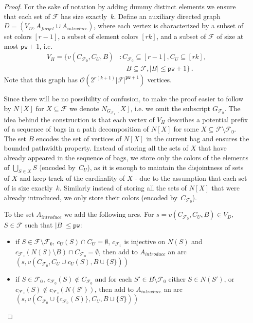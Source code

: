\documentclass[11pt]{article}
\theoremstyle{definition}
\newcommand{\cF}{{\mathcal{F}}}
\newcommand{\cg}{G_{\cF_0}}
\newcommand{\pw}{\ensuremath{\mathtt{pw}}\xspace}
\newcommand{\Oh}{\ensuremath{\mathcal{O}}}
\begin{document}
\begin{proof}
For the sake of notation by adding dummy distinct elements we ensure 
that each set of $\cF$ has size exactly~$k$.
Define an auxiliary directed graph $D=(V_D,A_{forget} \cup A_{introduce})$,
where each vertex is characterized by a subset of set colors $[r-1]$,
a subset of element colors $[rk]$, and a subset of $\cF$ of size at most $\pw+1$,
i.e.  
\begin{align*}
V_H = \{v(C_{\cF_0}, C_{U}, B) & : C_{\cF_0} \subseteq [r-1], C_U \subseteq [rk],\\
     & \quad B \subseteq \cF, |B| \le \pw+1\}\,.
\end{align*}
Note that this graph has $\Oh(2^{r(k+1)}|\cF|^{\pw+1})$ vertices.

Since there will be no possibility of confusion, to make the proof easier
to follow by $N[X]$ for $X \subseteq \cF$ we denote $N_{\cg}[X]$,
i.e. we omit the subscript $\cg$.
The idea behind the construction is that each vertex of $V_H$ describes
a potential prefix of a sequence of bags in a path decomposition of $N[X]$
for some $X \subseteq \cF \setminus \cF_0$.
The set $B$ encodes the set of vertices of $N[X]$ in the current bag
and ensures the bounded pathwidth property.
Instead of storing all the sets of $X$ that have already appeared in the 
sequence of bags, we store only the colors of the elements of $\bigcup_{S \in X} S$ (encoded by~$C_U$),
as it is enough to maintain the disjointness of sets of $X$
and keep track of the cardinality of $X$ - due to the assumption that each 
set of is size exactly~$k$.
Similarly instead of storing all the sets of $N[X]$
that were already introduced, we only store their colors (encoded by~$C_{\cF_0}$).

To the set $A_{introduce}$ we add the following arcs.
For $s = v(C_{\cF_0},C_U,B)  \in V_D$, $S \in \cF$
such that $|B| \le \pw$:
\begin{itemize}
  \item if $S \in \cF \setminus \cF_0$, $c_U(S) \cap C_U = \emptyset$, $c_{\cF_0}$ is injective on $N(S)$ 
  and $c_{\cF_0}(N(S) \setminus B) \cap C_{\cF_0} = \emptyset$,
  then add to $A_{introduce}$ an arc $(s, v(C_{\cF_0}, C_U \cup c_U(S), B \cup \{S\}))$
  \item if $S \in \cF_0$, $c_{\cF_0}(S) \not\in C_{\cF_0}$ and for each $S' \in B \setminus \cF_0$ 
  either $S \in N(S')$, or $c_{\cF_0}(S) \not\in c_{\cF_0}(N(S'))$,
  then add to $A_{introduce}$ an arc $(s, v(C_{\cF_0} \cup \{c_{\cF_0}(S)\}, C_U, B \cup \{S\}))$
\end{itemize}


\end{proof}
\end{document}

